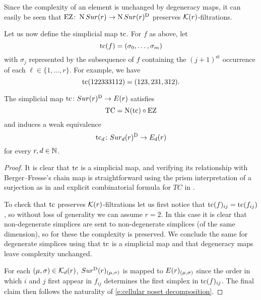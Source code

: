 Since the complexity of an element is unchanged by degeneracy maps, it can easily be seen that $\operatorname{EZ} \colon \operatorname{N}Sur(r) \to \operatorname{N}Sur(r)^{\mathrm{D}}$ preserves $\mathcal{K}(r)$-filtrations.

Let us now define the simplicial map $\operatorname{tc}$.
For $f$ as above, let
\[
\operatorname{tc}(f) = (\sigma_0,\dots,\sigma_m)
\]
with $\sigma_j$ represented by the subsequence of $f$ containing the $(j+1)^{\mathrm{st}}$ occurrence of each $\ell \in \{1,\dots,r\}$.
For example, we have
\[
\operatorname{tc}(122333112) = (123,231,312).
\]

\begin{theorem}
	The simplicial map $\operatorname{tc} \colon Sur(r)^{\mathrm{D}} \to E(r)$ satisfies
	\[
	\operatorname{TC} = \operatorname{N}(\operatorname{tc}) \circ \operatorname{EZ}
	\]
	and induces a weak equivalence
	\[
	\operatorname{tc}_d \colon Sur_d(r)^{\mathrm{D}} \to E_d(r)
	\]
	for every $r,d \in \mathbb{N}$.
\end{theorem}

\begin{proof}
	It is clear that $\operatorname{tc}$ is a simplicial map, and verifying its relationship with Berger--Fresse's chain map is straightforward using the prism interpretation of a surjection as in \cite[\S2.1]{berger2002prismatic} and explicit combinatorial formula for $TC$ in \cite[\S3.1]{berger2002prismatic}.

	To check that $\operatorname{tc}$ preserves $\mathcal{K}(r)$-filtrations let us first notice that $\operatorname{tc}(f)_{ij} = \operatorname{tc}(f_{ij})$, so without loss of generality we can assume $r=2$.
	In this case it is clear that non-degenerate simplices are sent to non-degenerate simplices (of the same dimension), so for these the complexity is preserved.
	We conclude the same for degenerate simplices using that $\operatorname{tc}$ is a simplicial map and that degeneracy maps leave complexity unchanged.

	For each $(\mu,\sigma) \in \mathcal{K}_d(r)$,  $Sur^{\mathrm{D}}(r)_{(\mu,\sigma)}$ is mapped to $E(r)_{(\mu,\sigma)}$ since the order in which $i$ and $j$ first appear in $f_{ij}$ determines the first simplex in $\operatorname{tc}(f)_{ij}$.
	The final claim then follows the naturality of \eqref{e:cellular poset decomposition}.
\end{proof}